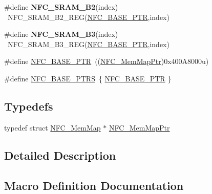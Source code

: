 \begin{DoxyCompactItemize}
\item 
\hypertarget{group___n_f_c___peripheral_gac8962ad0d173ea79ebf4ad772f92d331}{}\#define {\bfseries N\+F\+C\+\_\+\+S\+R\+A\+M\+\_\+\+B2}(index)                              ~N\+F\+C\+\_\+\+S\+R\+A\+M\+\_\+\+B2\+\_\+\+R\+E\+G(\hyperlink{group___n_f_c___peripheral_ga0777810803d598d0a435f71acd967563}{N\+F\+C\+\_\+\+B\+A\+S\+E\+\_\+\+P\+T\+R},index)\label{group___n_f_c___peripheral_gac8962ad0d173ea79ebf4ad772f92d331}

\item 
\hypertarget{group___n_f_c___peripheral_gabe3a3add5538db80da36bab4fe610115}{}\#define {\bfseries N\+F\+C\+\_\+\+S\+R\+A\+M\+\_\+\+B3}(index)                              ~N\+F\+C\+\_\+\+S\+R\+A\+M\+\_\+\+B3\+\_\+\+R\+E\+G(\hyperlink{group___n_f_c___peripheral_ga0777810803d598d0a435f71acd967563}{N\+F\+C\+\_\+\+B\+A\+S\+E\+\_\+\+P\+T\+R},index)\label{group___n_f_c___peripheral_gabe3a3add5538db80da36bab4fe610115}

\item 
\#define \hyperlink{group___n_f_c___peripheral_ga0777810803d598d0a435f71acd967563}{N\+F\+C\+\_\+\+B\+A\+S\+E\+\_\+\+P\+T\+R}~((\hyperlink{group___n_f_c___peripheral_gaf3e8f07065c3774f37c511c92cb3a80c}{N\+F\+C\+\_\+\+Mem\+Map\+Ptr})0x400\+A8000u)
\item 
\#define \hyperlink{group___n_f_c___peripheral_ga064c3ab7af82539da0d333201ec4da24}{N\+F\+C\+\_\+\+B\+A\+S\+E\+\_\+\+P\+T\+R\+S}~\{ \hyperlink{group___n_f_c___peripheral_ga0777810803d598d0a435f71acd967563}{N\+F\+C\+\_\+\+B\+A\+S\+E\+\_\+\+P\+T\+R} \}
\end{DoxyCompactItemize}
\subsection*{Typedefs}
\begin{DoxyCompactItemize}
\item 
typedef struct \hyperlink{struct_n_f_c___mem_map}{N\+F\+C\+\_\+\+Mem\+Map} $\ast$ \hyperlink{group___n_f_c___peripheral_gaf3e8f07065c3774f37c511c92cb3a80c}{N\+F\+C\+\_\+\+Mem\+Map\+Ptr}
\end{DoxyCompactItemize}


\subsection{Detailed Description}


\subsection{Macro Definition Documentation}
\hypertarget{group___n_f_c___peripheral_ga0777810803d598d0a435f71acd967563}{}
